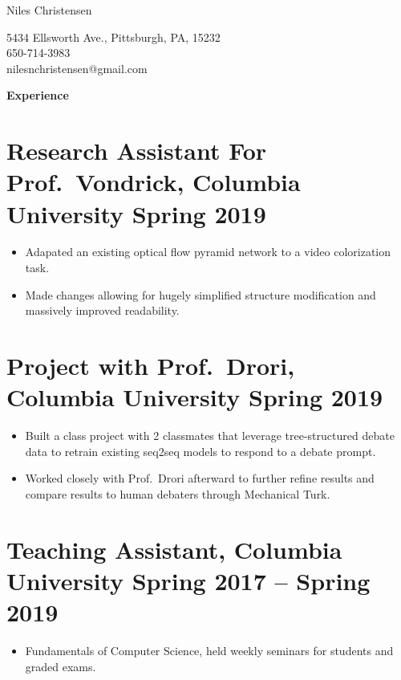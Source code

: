 \documentclass{article}
\newenvironment{tightcenter}{%
  \setlength\topsep{0pt}
  \setlength\parskip{0pt}
  \begin{center}
}{%
  \end{center}
}
\begin{document}
\begin{tightcenter}
\begin{Large}Niles Christensen\\
\end{Large}
\begin{small}
5434 Ellsworth Ave., Pittsburgh, PA, 15232\\
650-714-3983\\
nilesnchristensen@gmail.com
\end{small}
\end{tightcenter}

\noindent
\large{\textbf{Experience}}

\section*{\textbf{Research Assistant For Prof.\ Vondrick, Columbia University \hfill	Spring 2019}}
\begin{itemize}[noitemsep]
    \item Adapated an existing optical flow pyramid network to a video colorization task.
    \item Made changes allowing for hugely simplified structure modification and massively improved readability.
\end{itemize}

\section*{\textbf{Project with Prof.\ Drori, Columbia University \hfill Spring 2019}}
\begin{itemize}[noitemsep]
  \item Built a class project with 2 classmates that leverage tree-structured debate data to retrain existing seq2seq models to respond to a debate prompt.
  \item Worked closely with Prof.\ Drori afterward to further refine results and compare results to human debaters through Mechanical Turk.
\end{itemize}

\section*{\textbf{Teaching Assistant, Columbia University \hfill	Spring 2017 -- Spring 2019 }}
\begin{itemize}
    \item Fundamentals of Computer Science, held weekly seminars for students and graded exams.
\end{itemize}
\end{document}
